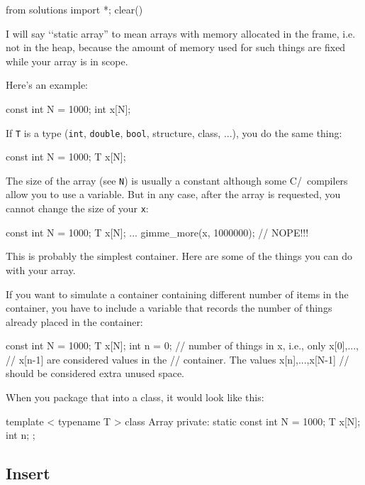 \begin{python0}
from solutions import *; clear()
\end{python0}

I will say \lq\lq static array'' to mean arrays with memory
allocated in the frame, i.e. not in the heap,
because the amount of memory used for such things are fixed
while your array is in scope.

Here's an example:
\begin{console}[fontsize=\footnotesize]
const int N = 1000;
int x[N];
\end{console}

If \verb!T! is a type (\verb!int!, \verb!double!, \verb!bool!,
structure, class, ...), you do the same thing:
\begin{console}[fontsize=\footnotesize]
const int N = 1000;
T x[N];
\end{console}
The size of the array (see \verb!N!) is usually a constant
although some C/\cpp\ compilers allow you to use a variable.
But in any case, after the array is requested, you cannot
change the size of your \verb!x!:
\begin{console}[fontsize=\footnotesize]
const int N = 1000;
T x[N];
...
gimme_more(x, 1000000); // NOPE!!!
\end{console}

This is probably the simplest container.
Here are some of the things you can do with your array.

If you want to simulate a container containing different number of
items in the container, you have to include a variable that
records the number of things already placed in the container:
\begin{console}[fontsize=\footnotesize]
const int N = 1000;
T x[N];
int n = 0; // number of things in x, i.e., only x[0],...,
           // x[n-1] are considered values in the 
           // container. The values x[n],...,x[N-1] 
           // should be considered extra unused space.
\end{console}

When you package that into a class, it would look like this:
\begin{console}[frame=single,fontsize=\footnotesize]
template < typename T >
class Array
{
private:
    static const int N = 1000;
    T x[N];
    int n;
};
\end{console}


\newpage
\subsection{Insert}

